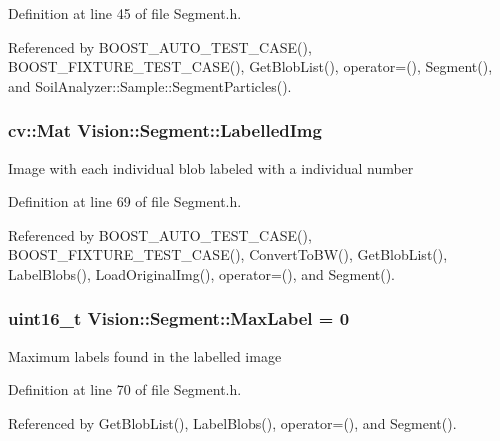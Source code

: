 Definition at line 45 of file Segment.\+h.



Referenced by B\+O\+O\+S\+T\+\_\+\+A\+U\+T\+O\+\_\+\+T\+E\+S\+T\+\_\+\+C\+A\+S\+E(), B\+O\+O\+S\+T\+\_\+\+F\+I\+X\+T\+U\+R\+E\+\_\+\+T\+E\+S\+T\+\_\+\+C\+A\+S\+E(), Get\+Blob\+List(), operator=(), Segment(), and Soil\+Analyzer\+::\+Sample\+::\+Segment\+Particles().

\hypertarget{class_vision_1_1_segment_a4daa143f6cd4a753d3bbe45c6a67d27f}{}
\subsubsection[{Labelled\+Img}]{\setlength{\rightskip}{0pt plus 5cm}cv\+::\+Mat Vision\+::\+Segment\+::\+Labelled\+Img}\label{class_vision_1_1_segment_a4daa143f6cd4a753d3bbe45c6a67d27f}
Image with each individual blob labeled with a individual number 

Definition at line 69 of file Segment.\+h.



Referenced by B\+O\+O\+S\+T\+\_\+\+A\+U\+T\+O\+\_\+\+T\+E\+S\+T\+\_\+\+C\+A\+S\+E(), B\+O\+O\+S\+T\+\_\+\+F\+I\+X\+T\+U\+R\+E\+\_\+\+T\+E\+S\+T\+\_\+\+C\+A\+S\+E(), Convert\+To\+B\+W(), Get\+Blob\+List(), Label\+Blobs(), Load\+Original\+Img(), operator=(), and Segment().

\hypertarget{class_vision_1_1_segment_a22d2a688de65f4d25b164f8b2a03f4a9}{}
\subsubsection[{Max\+Label}]{\setlength{\rightskip}{0pt plus 5cm}uint16\+\_\+t Vision\+::\+Segment\+::\+Max\+Label = 0}\label{class_vision_1_1_segment_a22d2a688de65f4d25b164f8b2a03f4a9}
Maximum labels found in the labelled image 

Definition at line 70 of file Segment.\+h.



Referenced by Get\+Blob\+List(), Label\+Blobs(), operator=(), and Segment().

\hypertarget{class_vision_1_1_segment_a97077da3a144e800073bc06f5d4722d4}{}
